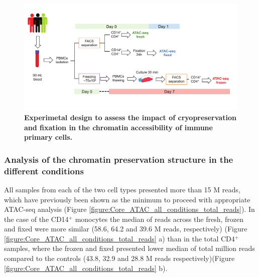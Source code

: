 \begin{landscape}
\begin{figure}[H]
\centering
\includegraphics[width=\textwidth]{./Results1/pdfs/Chapter3_core_experimental_design}
\caption[Experimetal design to assess the impact of cryopreservation and fixation in the chromatin accessibility of immune primary cells.]{\textbf{Experimetal design to assess the impact of cryopreservation and fixation in the chromatin accessibility of immune primary cells.}}
\label{figure:Core_experimental_design}
\end{figure}
\end{landscape}



\subsubsection{Analysis of the chromatin preservation structure in the different conditions}

All samples from each of the two cell types presented more than 15 M reads, which have previously been shown as the minimum to proceed with appropriate ATAC-seq analysis (Figure \ref{figure:Core_ATAC_all_conditions_total_reads}). In the case of the CD14$^+$ monocytes the median of reads across the fresh, frozen and fixed were more similar (58.6, 64.2 and 39.6 M reads, respectively) (Figure \ref{figure:Core_ATAC_all_conditions_total_reads} a) than in the total CD4$^+$ samples, where the frozen and fixed presented lower median of total million reads compared to the controls (43.8, 32.9 and 28.8 M reads respectively)(Figure \ref{figure:Core_ATAC_all_conditions_total_reads} b).

